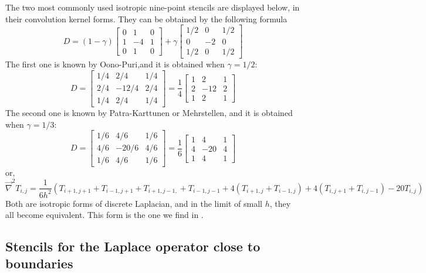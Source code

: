 The two most commonly used isotropic nine-point stencils are displayed below, in their convolution kernel forms. They can be obtained by the following formula
\[
D = (1-\gamma) 
\left[
\begin{array}{ccc}
0 &1 &0 \\
1 &-4 &1 \\
0 &1 &0
\end{array}
\right]
+\gamma
\left[
\begin{array}{ccc}
1/2 &0 & 1/2 \\
0 & -2 & 0 \\
1/2 &0 & 1/2 
\end{array}
\right]
\]
The first one is known by Oono-Puri,and it is obtained when $\gamma=1/2$:
\[
D=
\left[
\begin{array}{ccc}
1/4 & 2/4 & 1/4 \\
2/4 &-12/4 & 2/4 \\
1/4 & 2/4 & 1/4 
\end{array}
\right]
=
\frac14
\left[
\begin{array}{ccc}
1 & 2 & 1 \\
2 &-12 & 2 \\
1 & 2 & 1 
\end{array}
\right]
\]
The second one is known by Patra-Karttunen or Mehrstellen, and it is obtained when $\gamma=1/3$:
\[
D=
\left[
\begin{array}{ccc}
1/6 & 4/6 & 1/6 \\
4/6 & -20/6 & 4/6 \\
1/6 & 4/6 & 1/6 
\end{array}
\right]
=
\frac16
\left[
\begin{array}{ccc}
1 & 4 & 1 \\
4 & -20 & 4 \\
1 & 4 & 1 
\end{array}
\right]
\]
or,
\[
\vec\nabla^2 T_{i,j} = \frac{1}{6h^2} (T_{i+1,j+1} + T_{i-1,j+1} + T_{i+1,j-1,} + T_{i-1,j-1}
+4 (T_{i+1,j}+T_{i-1,j})
+4 (T_{i,j+1}+T_{i,j-1})
-20 T_{i,j} )
\]
Both are isotropic forms of discrete Laplacian, and in the limit of small $h$, they all become equivalent. This form is the one we find in \textcite[p64]{leveque}.

\subsection{Stencils for the Laplace operator close to boundaries} \label{ss:stencilLaplaceBnd}


